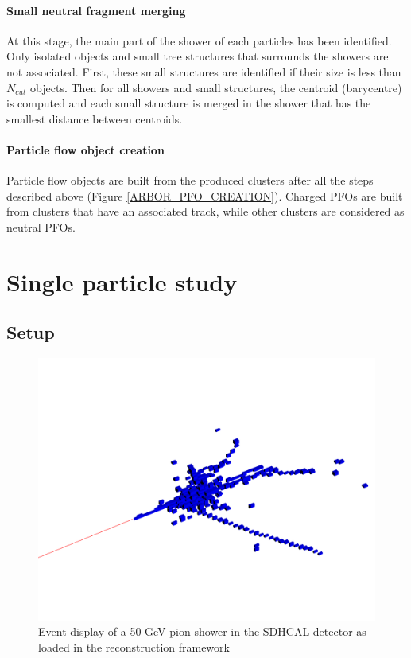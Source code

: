 \documentclass[cits]{JINST}
\begin{document}
\paragraph*{Small neutral fragment merging} At this stage, the main part of the shower of each particles has been identified. Only isolated objects and small tree structures that surrounds the showers are not associated. First, these small structures are identified if their size is less than $N_{cut}$ objects. Then for all showers and small structures, the centroid (barycentre) is computed and each small structure is merged in the shower that has the smallest distance between centroids.

\paragraph*{Particle flow object creation} Particle flow objects are built from the produced clusters after all the steps described above (Figure \ref{ARBOR_PFO_CREATION}). Charged PFOs are built from clusters that have an associated track, while other clusters are considered as neutral PFOs.

\newpage
\section{Single particle study}
\label{SINGLE_PARTICLE_STUDY_SECTION}

\subsection{Setup}

\begin{figure}
  \vspace{-20pt}
  \begin{center}
    \includegraphics[width=\linewidth]{SingleParticleSetup.pdf}
  \end{center}
  \vspace{-10pt}
  \caption{\label{ARBOR_SINGLE_PARTICLE_SETUP} Event display of a 50 GeV pion shower in the SDHCAL detector as loaded in the reconstruction framework}
\end{figure}
\end{document}
